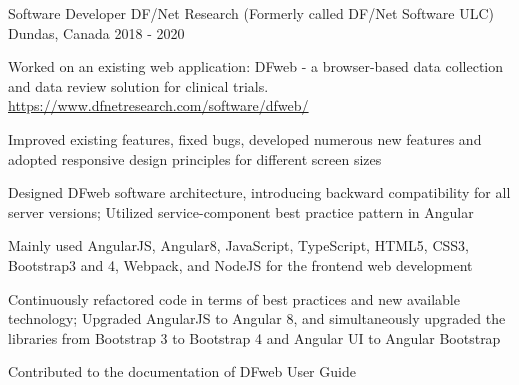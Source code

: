 \begin{cventries}
  \cventry
{Software Developer} %
{DF/Net Research (Formerly called DF/Net Software ULC)} %
{Dundas, Canada} %
{2018 - 2020} %
{Worked on an existing web application: DFweb -  a browser-based data collection and data review solution for clinical trials. \href{https://www.dfnetresearch.com/software/dfweb/}{https://www.dfnetresearch.com/software/dfweb/}
\vspace{6.0mm}
\begin{cvitems}
		\item
		{Improved existing features, fixed bugs, developed numerous new features and adopted responsive design principles for different screen sizes}
		\item
		{Designed DFweb software architecture, introducing backward compatibility for all server versions; Utilized service-component best practice pattern in Angular}
		\item
		{Mainly used AngularJS, Angular8, JavaScript, TypeScript, HTML5, CSS3, Bootstrap3 and 4, Webpack, and NodeJS for the frontend web development}
		\item
		{Continuously refactored code in terms of best practices and new available technology; Upgraded AngularJS to Angular 8, and simultaneously upgraded the libraries from Bootstrap 3 to Bootstrap 4 and Angular UI to Angular Bootstrap }
		\item
		{Contributed to the documentation of DFweb User Guide}
	\end{cvitems}
}

	




\end{cventries}
